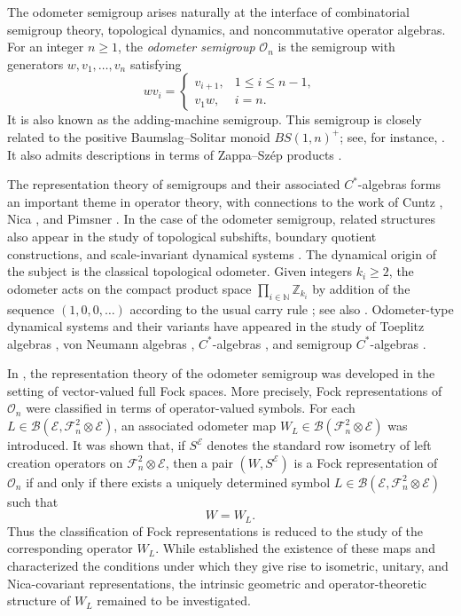 \documentclass[12pt]{amsart}
\theoremstyle{definition}
\theoremstyle{remark}
\def \N{\mathbb{N}}
\newcommand{\clb}{\mathcal{B}}
\newcommand{\cle}{\mathcal{E}}
\newcommand{\clf}{\mathcal{F}}
\newcommand{\clo}{\mathcal{O}}
\numberwithin{equation}{section}
\begin{document}
The odometer semigroup arises naturally at the interface of combinatorial semigroup theory, topological dynamics, and noncommutative operator algebras. For an integer \(n\geq 1\), the \emph{odometer semigroup} \(\clo_n\) is the semigroup with generators
\(w,v_1,\ldots,v_n\) satisfying
\[
w v_i =
\begin{cases}
v_{i+1}, & 1 \leq i \leq n-1,\\
v_1 w, & i=n.
\end{cases}
\]
It is also known as the adding-machine semigroup. This semigroup is closely related to the positive Baumslag--Solitar monoid $BS(1,n)^+$; see, for instance, \cite{Foreman}. It also admits descriptions in terms of Zappa--Sz\'ep products \cite{Geb}.

The representation theory of semigroups and their associated
$C^*$-algebras forms an important theme in operator theory, with
connections to the work of Cuntz \cite{cuntz1977}, Nica \cite{Anica}, and Pimsner \cite{pimsner1997}. In the case of the odometer semigroup, related structures also appear in the study of topological subshifts, boundary quotient constructions, and scale-invariant dynamical systems \cite{brownlowe2012,julien2016,laca1996,li2022}. The dynamical origin of the subject is the classical topological odometer. Given integers $k_i\geq 2$, the odometer acts on the compact product space $\prod_{i\in\N}\mathbb Z_{k_i}$
by addition of the sequence $(1,0,0,\ldots)$ according to the usual carry rule \cite{Foreman}; see also \cite{Brin,Bruin,Del}. Odometer-type dynamical systems and their variants have appeared in the study of Toeplitz algebras \cite{Clark}, von Neumann algebras \cite{Fima}, $C^*$-algebras \cite{Spiel}, and semigroup \(C^*\)-algebras \cite{Brown,Hli,xli,Anica}.

In \cite{mansi2025}, the representation theory of the odometer semigroup was developed in the setting of vector-valued full Fock spaces. More precisely, Fock representations of $\clo_n$ were classified in terms of operator-valued symbols. For each $L\in \clb(\cle,\clf_n^2\otimes\cle)$, an associated odometer map $W_L\in \clb(\clf_n^2\otimes\cle)$ was introduced. It was shown that, if $S^\cle$ denotes the standard row
isometry of left creation operators on $\clf_n^2\otimes\cle$, then a pair $(W,S^\cle)$ is a Fock representation of $\clo_n$ if and only if there exists a uniquely determined symbol
$L\in \clb(\cle,\clf_n^2\otimes\cle)$ such that
\[
W=W_L.
\]
Thus the classification of Fock representations is reduced to the study of the corresponding operator $W_L$. While \cite{mansi2025} established the existence of these maps and characterized the conditions under which they give rise to isometric, unitary, and Nica-covariant representations, the intrinsic geometric and operator-theoretic structure of $W_L$ remained to be investigated.
\end{document}
